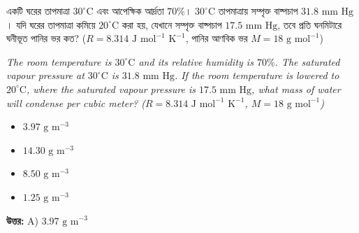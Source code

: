 \documentclass[12pt, a4paper]{article}
\begin{document}
\begin{tcolorbox}[questionbox={প্রশ্ন (Question) 11}]
    \noindent
    একটি ঘরের তাপমাত্রা $30^\circ\text{C}$ এবং আপেক্ষিক আর্দ্রতা $70\%$। $30^\circ\text{C}$ তাপমাত্রায় সম্পৃক্ত বাষ্পচাপ $31.8\text{ mm Hg}$। যদি ঘরের তাপমাত্রা কমিয়ে $20^\circ\text{C}$ করা হয়, যেখানে সম্পৃক্ত বাষ্পচাপ $17.5\text{ mm Hg}$, তবে প্রতি ঘনমিটারে ঘনীভূত পানির ভর কত? ($R = 8.314\text{ J mol}^{-1}\text{ K}^{-1}$, পানির আণবিক ভর $M = 18\text{ g mol}^{-1}$)
    
    \vspace{0.8em}
    \begin{english}
    \noindent\textit{\color{darkgray}
    The room temperature is $30^\circ\text{C}$ and its relative humidity is $70\%$. The saturated vapour pressure at $30^\circ\text{C}$ is $31.8\text{ mm Hg}$. If the room temperature is lowered to $20^\circ\text{C}$, where the saturated vapour pressure is $17.5\text{ mm Hg}$, what mass of water will condense per cubic meter? ($R = 8.314\text{ J mol}^{-1}\text{ K}^{-1}$, $M = 18\text{ g mol}^{-1}$)
    }
    \end{english}
\end{tcolorbox}

\begin{itemize}[label={}, leftmargin=1cm, itemsep=0.5em]
    \item[\textbf{A)}] $3.97\text{ g m}^{-3}$
    \item[\textbf{B)}] $14.30\text{ g m}^{-3}$
    \item[\textbf{C)}] $8.50\text{ g m}^{-3}$
    \item[\textbf{D)}] $1.25\text{ g m}^{-3}$
\end{itemize}

\vspace{0.5em}
\begin{tcolorbox}[answerbox]
    \textbf{\color{success} উত্তর:} A) $3.97\text{ g m}^{-3}$
\end{tcolorbox}
\vspace{1em}
\end{document}
